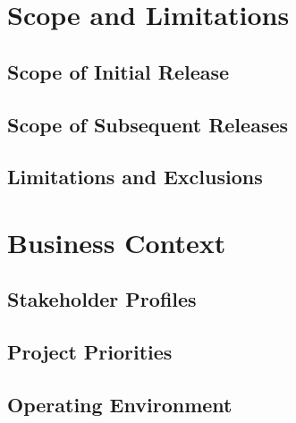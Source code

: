 \documentclass[11pt]{article}
\begin{document}
\section{Scope and Limitations}
\subsection{Scope of Initial Release}
\subsection{Scope of Subsequent Releases}
\subsection{Limitations and Exclusions}

\section{Business Context}
\subsection{Stakeholder Profiles}
\subsection{Project Priorities}
\subsection{Operating Environment}
\end{document}
